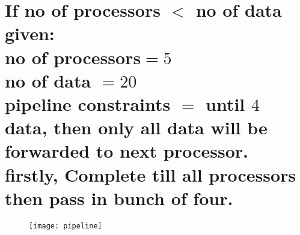 \section{If no of processors $  < $ no of data given:
    {\footnotesize \\no of processors$  =5 $
    \\no of data $ =20 $
    \\pipeline constraints $ = $ until $ 4 $ data, then only all data will be forwarded to next processor.
    \\firstly, Complete till all processors then pass in bunch of four.}}
\begin{figure}[!htbp]
    \centering
    \texttt{[image: pipeline]}
\end{figure}